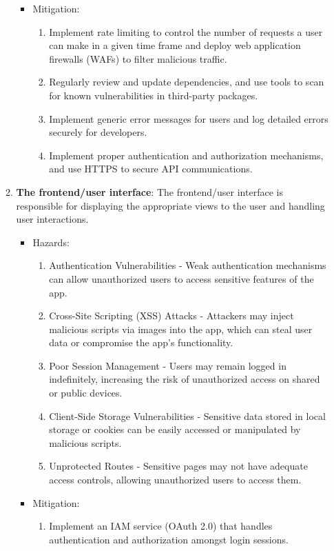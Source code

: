 \documentclass{article}
\begin{document}
\begin{enumerate}
\begin{enumerate}
\begin{itemize}
\begin{enumerate}
				\end{enumerate}
			\item Mitigation:
				\begin{enumerate}
					\item Implement rate limiting to control the number of requests a user can make in a given time frame and deploy web application firewalls (WAFs) to filter malicious traffic. 
					\item Regularly review and update dependencies, and use tools to scan for known vulnerabilities in third-party packages.
					\item Implement generic error messages for users and log detailed errors securely for developers.
					\item Implement proper authentication and authorization mechanisms, and use HTTPS to secure API communications.
				\end{enumerate}
		\end{itemize}
        \item \textbf{The frontend/user interface}: The frontend/user interface
        is responsible for displaying the appropriate views to the user and
        handling user interactions.
		\begin{itemize}
			\item Hazards:
				\begin{enumerate}
					\item Authentication Vulnerabilities - Weak authentication mechanisms can allow unauthorized users to access sensitive features of the app.
					\item Cross-Site Scripting (XSS) Attacks - Attackers may inject malicious scripts via images into the app, which can steal user data or compromise the app's functionality.
					\item Poor Session Management - Users may remain logged in indefinitely, increasing the risk of unauthorized access on shared or public devices.
					\item Client-Side Storage Vulnerabilities - Sensitive data stored in local storage or cookies can be easily accessed or manipulated by malicious scripts.
					\item Unprotected Routes - Sensitive pages may not have adequate access controls, allowing unauthorized users to access them.
				\end{enumerate}
			\item Mitigation:
				\begin{enumerate}
					\item Implement an IAM service (OAuth 2.0) that handles authentication and authorization amongst login sessions.

\end{enumerate}
\end{itemize}
\end{enumerate}
\end{enumerate}
\end{document}
